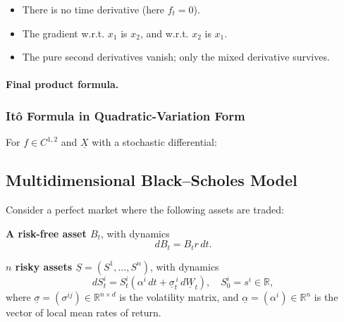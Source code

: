\documentclass[12pt,a4paper]{article}
\theoremstyle{definition}
\newcommand{\R}{\mathbb{R}}
\begin{document}
\begin{itemize}
\item There is no time derivative (here $f_t = 0$).
\item The gradient w.r.t. $x_1$ is $x_2$, and w.r.t. $x_2$ is $x_1$.
\item The pure second derivatives vanish; only the mixed derivative survives.
\end{itemize}

\paragraph{Final product formula.}

\begin{center}
\end{center}

\subsubsection{Itô Formula in Quadratic-Variation Form}

For $f \in C^{1,2}$ and $\underline{X}$ with a stochastic differential:

\begin{center}
\end{center}

\subsection{Multidimensional Black--Scholes Model}

Consider a perfect market where the following assets are traded:

\textbf{A risk-free asset $B_t$}, with dynamics
\[
dB_t = B_t r \, dt.
\]

\textbf{$n$ risky assets $\underline{S} = (S^1, \ldots, S^n)$}, with dynamics
\[
dS_t^i = S_t^i(\alpha^i \, dt + \underline{\sigma}_t^{\,i} \, d\underline{W}_t), \quad S_0^i = s^i \in \R,
\]
where $\underline{\sigma} = (\sigma^{ij}) \in \R^{n \times d}$ is the volatility matrix, and $\underline{\alpha} = (\alpha^i) \in \R^n$ is the vector of local mean rates of return.
\end{document}

